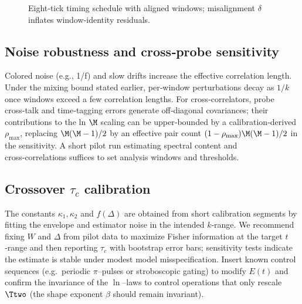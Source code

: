 \documentclass[12pt,a4paper]{article}
\theoremstyle{definition}
\theoremstyle{remark}
\begin{document}
\begin{figure}[t]
  \centering
  \caption{Eight‑tick timing schedule with aligned windows; misalignment \(\delta\) inflates window‑identity residuals.}
  \label{fig:timing}
\end{figure}

\subsection{Noise robustness and cross‑probe sensitivity}
Colored noise (e.g., 1/f) and slow drifts increase the effective correlation length. Under the mixing bound stated earlier, per‑window perturbations decay as \(1/k\) once windows exceed a few correlation lengths. For cross‑correlators, probe cross‑talk and time‑tagging errors generate off‑diagonal covariances; their contributions to the ln \(\M\) scaling can be upper‑bounded by a calibration‑derived \(\rho_{\mathrm{max}}\), replacing \(\M(\M-1)/2\) by an effective pair count \((1-\rho_{\mathrm{max}})\M(\M-1)/2\) in the sensitivity. A short pilot run estimating spectral content and cross‑correlations suffices to set analysis windows and thresholds.

\subsection{Crossover \(\tau_c\) calibration}
The constants \(\kappa_1,\kappa_2\) and \(f(\Delta)\) are obtained from short calibration segments by fitting the envelope and estimator noise in the intended \(k\)‑range. We recommend fixing \(W\) and \(\Delta\) from pilot data to maximize Fisher information at the target \(t\)‑range and then reporting \(\tau_c\) with bootstrap error bars; sensitivity tests indicate the estimate is stable under modest model misspecification.
Insert known control sequences (e.g.\ periodic \(\pi\)--pulses or stroboscopic gating) to modify \(E(t)\) and confirm the invariance of the \(\ln\)--laws to control operations that only rescale \(\Ttwo\) (the shape exponent \(\beta\) should remain invariant).
\end{document}
